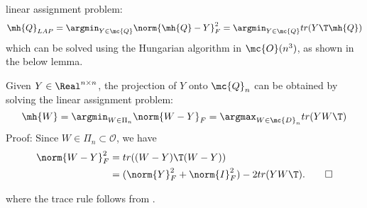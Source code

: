 % 

linear assignment problem:
\begin{align}
	\mh{Q}_{LAP} = \argmin_{Y \in \mc{Q}} \norm{\mh{Q} - Y}_F^2 = \argmin_{Y \in \mc{Q}} tr (Y\T \mh{Q})
\end{align}
which can be solved using the Hungarian algorithm in $\mc{O}(n^3)$, as shown in the below lemma. 

\begin{Lem}
  Given $Y \in \Real^{n \times n}$, the projection of $Y$ onto $\mc{Q}_n$ can
  be obtained by solving the linear assignment problem:
  $$ 
  \mh{W}= \argmin_{W \in \Pi_n} \norm{ W-Y}_F = \argmax_{W \in \mc{D}_n}  tr(YW\T)
  $$
  Proof: Since $W \in \Pi_n \subset \mathcal O$, we have
  \begin{align}
  \norm{W-Y}_F^2 &= tr( (W-Y)\T (W-Y)) \\
  &= (\norm{Y}_F^2 + \norm{I}_F^2) - 2tr( Y W\T ). \qed
  \end{align}
\end{Lem}
where the trace rule follows from \cite{HornJohnson}.




